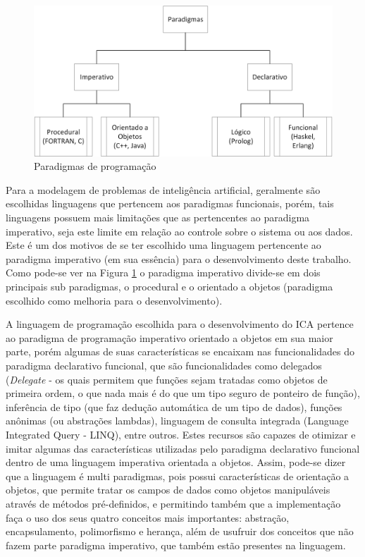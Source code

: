 \begin{figure}[h]
	\centering	
	\includegraphics[scale=0.7]{Figuras/Ilustrations-Paradigms.png}
	\caption{Paradigmas de programação}
	\label{fig:Ilustrations-Paradigms}
	\end{figure}


Para a modelagem de problemas de inteligência artificial, geralmente são escolhidas linguagens que pertencem aos paradigmas funcionais, porém, tais linguagens possuem mais limitações que as pertencentes ao paradigma imperativo, seja este limite em relação ao controle sobre o sistema ou aos dados. Este é um dos motivos de se ter escolhido uma linguagem pertencente ao paradigma imperativo (em sua essência) para o desenvolvimento deste trabalho. Como pode-se ver na Figura \ref{fig:Ilustrations-Paradigms} o paradigma imperativo divide-se em dois principais sub paradigmas, o procedural e o orientado a objetos (paradigma escolhido como melhoria para o desenvolvimento). 

A linguagem de programação escolhida para o desenvolvimento do ICA pertence ao paradigma de programação imperativo orientado a objetos em sua maior parte, porém algumas de suas características se encaixam nas funcionalidades do paradigma declarativo funcional, que são funcionalidades como delegados (\emph{Delegate} - os quais permitem que funções sejam tratadas como objetos de primeira ordem, o que nada mais é do que um tipo seguro de ponteiro de função), inferência de tipo (que faz dedução automática de um tipo de dados), funções anônimas (ou abstrações lambdas), linguagem de consulta integrada (Language Integrated Query - LINQ), entre outros. Estes recursos são capazes de otimizar e imitar algumas das características utilizadas pelo paradigma declarativo funcional dentro de uma linguagem imperativa orientada a objetos. Assim, pode-se dizer que a linguagem é multi paradigmas, pois possui características de orientação a objetos, que permite tratar os campos de dados como objetos manipuláveis através de métodos pré-definidos, e permitindo também que a implementação faça o uso dos seus quatro conceitos mais importantes: abstração, encapsulamento, polimorfismo e herança, além de usufruir dos conceitos que não fazem parte paradigma imperativo, que também estão presentes na linguagem. 

